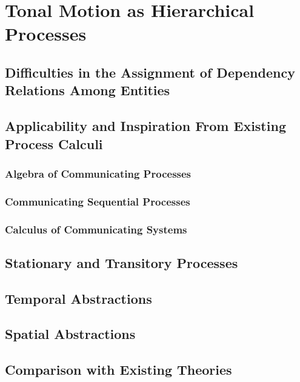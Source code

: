 \chapter{Tonal Motion as Hierarchical Processes}
    \section{Difficulties in the Assignment of Dependency Relations Among Entities}
    \section{Applicability and Inspiration From Existing Process Calculi}
        \subsection{Algebra of Communicating Processes}
        \subsection{Communicating Sequential Processes}
        \subsection{Calculus of Communicating Systems}
    \section{Stationary and Transitory Processes}
    \section{Temporal Abstractions}
    \section{Spatial Abstractions}
    \section{Comparison with Existing Theories}
